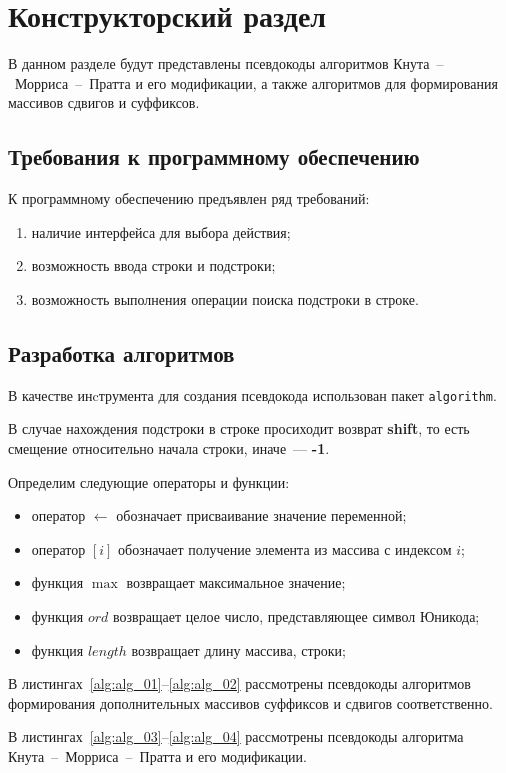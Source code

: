 \chapter{Конструкторский раздел}
В данном разделе будут представлены псевдокоды алгоритмов Кнута~--~Морриса~--~Пратта и его модификации, а также алгоритмов для формирования массивов сдвигов и суффиксов.

\section{Требования к программному обеспечению}
К программному обеспечению предъявлен ряд требований:
\begin{enumerate}
	\item наличие интерфейса для выбора действия;
	\item возможность ввода строки и подстроки;
	\item возможность выполнения операции поиска подстроки в строке.
\end{enumerate}

\section{Разработка алгоритмов}
В качестве инcтрумента для создания псевдокода использован пакет \texttt{algorithm}.

В случае нахождения подстроки в строке просиходит возврат \textbf{shift}, то есть смещение относительно начала строки, иначе~--- \textbf{-1}. 

Определим следующие операторы и функции:
\begin{itemize}
	\item оператор $\gets$ обозначает присваивание значение переменной;
	\item оператор $[i]$ обозначает получение элемента из массива с индексом $i$;
	\item функция $\max$ возвращает максимальное значение;
	\item функция $ord$ возвращает целое число, представляющее символ Юникода;
	\item функция $length$ возвращает длину массива, строки;
\end{itemize}

В листингах~\ref{alg:alg_01}--\ref{alg:alg_02} рассмотрены псевдокоды алгоритмов формирования дополнительных массивов суффиксов и сдвигов соответственно. 

В листингах~\ref{alg:alg_03}--\ref{alg:alg_04} рассмотрены псевдокоды алгоритма Кнута~--~Морриса~--~Пратта и его модификации. 

